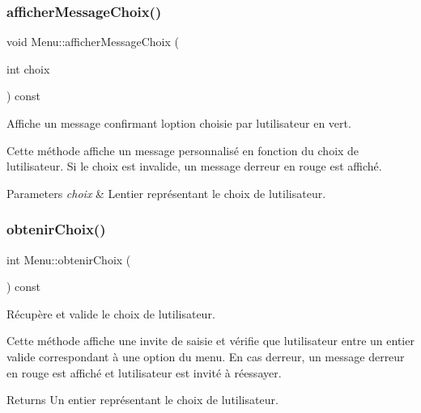 \subsubsection{\texorpdfstring{afficher\+Message\+Choix()}{afficherMessageChoix()}\hspace{0.1cm}{\footnotesize\ttfamily [2/2]}}
{\footnotesize\ttfamily void Menu\+::afficher\+Message\+Choix (\begin{DoxyParamCaption}\item[{int}]{choix }\end{DoxyParamCaption}) const}



Affiche un message confirmant l\textquotesingle{}option choisie par l\textquotesingle{}utilisateur en vert. 

Cette méthode affiche un message personnalisé en fonction du choix de l\textquotesingle{}utilisateur. Si le choix est invalide, un message d\textquotesingle{}erreur en rouge est affiché.


\begin{DoxyParams}{Parameters}
{\em choix} & L\textquotesingle{}entier représentant le choix de l\textquotesingle{}utilisateur. \\
\hline
\end{DoxyParams}
\mbox{\label{classMenu_a7a46776577f8cba63999b1bbe85576ed}} 
\subsubsection{\texorpdfstring{obtenir\+Choix()}{obtenirChoix()}\hspace{0.1cm}{\footnotesize\ttfamily [1/2]}}
{\footnotesize\ttfamily int Menu\+::obtenir\+Choix (\begin{DoxyParamCaption}{ }\end{DoxyParamCaption}) const}



Récupère et valide le choix de l\textquotesingle{}utilisateur. 

Cette méthode affiche une invite de saisie et vérifie que l\textquotesingle{}utilisateur entre un entier valide correspondant à une option du menu. En cas d\textquotesingle{}erreur, un message d\textquotesingle{}erreur en rouge est affiché et l\textquotesingle{}utilisateur est invité à réessayer.

\begin{DoxyReturn}{Returns}
Un entier représentant le choix de l\textquotesingle{}utilisateur. 
\end{DoxyReturn}
\mbox{\label{classMenu_a7a46776577f8cba63999b1bbe85576ed}} 
